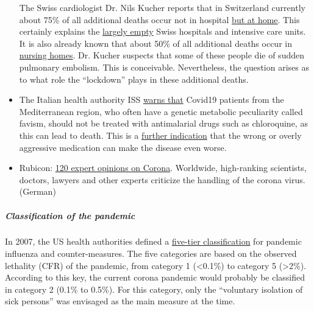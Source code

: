 \begin{itemize}
  The Swiss cardiologist Dr. Nils Kucher reports that in Switzerland
  currently about 75\% of all additional deaths occur not in hospital
  \href{https://www.tagesspiegel.de/wissen/woran-sterben-corona-patienten-wirklich-ein-schweizer-forscher-macht-hoffnung-im-kampf-gegen-covid-19/25750666.html}{but
  at home}. This certainly explains the
  \href{https://swprs.files.wordpress.com/2020/04/intensivbettenbelegung-schweiz-2020-04-14.png}{largely
  empty} Swiss hospitals and intensive care units. It is also already
  known that about 50\% of all additional deaths occur in
  \href{https://www.nzz.ch/zuerich/coronavirus-zuerich-aendert-nun-das-testregime-in-heimenauch-viele-aeltere-covid-19-infizierte-entwickeln-keine-symptome-zuerich-aendert-nun-das-testregime-in-heimen-ld.1552089}{nursing
  homes}. Dr. Kucher suspects that some of these people die of sudden
  pulmonary embolism. This is conceivable. Nevertheless, the question
  arises as to what role the ``lockdown'' plays in these additional
  deaths.
\item
  The Italian health authority ISS
  \href{https://www.iss.it/en/rapporti-covid-19/-/asset_publisher/btw1J82wtYzH/content/id/5334891}{warns
  that} Covid19 patients from the Mediterranean region, who often have a
  genetic metabolic peculiarity called favism, should not be treated
  with antimalarial drugs such as chloroquine, as this can lead to
  death. This is a
  \href{https://www.sciencedaily.com/releases/2020/02/200206110703.htm}{further
  indication} that the wrong or overly aggressive medication can make
  the disease even worse.
\item
  Rubicon:
  \href{https://www.rubikon.news/artikel/120-expertenstimmen-zu-corona}{120
  expert opinions on Corona}. Worldwide, high-ranking scientists,
  doctors, lawyers and other experts criticize the handling of the
  corona virus. (German)
\end{itemize}

\hypertarget{classification-of-the-pandemic}{%
\subparagraph{\texorpdfstring{\textbf{Classification of the
pandemic}}{Classification of the pandemic}}\label{classification-of-the-pandemic}}

In 2007, the US health authorities defined a
\href{https://www.cidrap.umn.edu/news-perspective/2007/02/hhs-ties-pandemic-mitigation-advice-severity}{five-tier
classification} for pandemic influenza and counter-measures. The five
categories are based on the observed lethality (CFR) of the pandemic,
from category 1 (\textless{}0.1\%) to category 5 (\textgreater{}2\%).
According to this key, the current corona pandemic would probably be
classified in category 2 (0.1\% to 0.5\%). For this category, only the
``voluntary isolation of sick persons'' was envisaged as the main
measure at the time.

